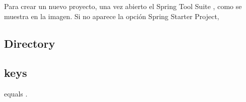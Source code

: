 	Para crear un nuevo proyecto, una vez abierto el Spring Tool Suite , como se muestra en la imagen. Si no aparece la opción Spring Starter Project, 
	
	\subsection{Directory}
	
	
	\subsection{keys}
	
	 equals .
	
	
